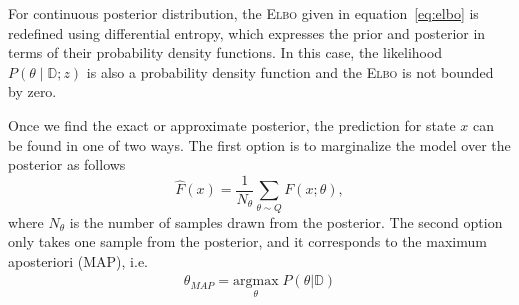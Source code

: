 \begin{rem}
  For continuous posterior distribution, the \textsc{Elbo} given in
  equation~\eqref{eq:elbo} is redefined using differential entropy, which
  expresses the prior and posterior in terms of their probability density
  functions. In this case, the likelihood $P(\theta \mid \mathbb{D};z)$ is also
  a probability density function and the \textsc{Elbo} is not bounded by zero.
\end{rem}


Once we find the exact or approximate posterior, the prediction for state $x$
can be found in one of two ways. The first option is to marginalize the model
over the posterior as follows~\cite{jospin2020hands}
\begin{equation}
  \hat{F}(x) = \frac{1}{N_{\theta}} \sum_{\theta \sim Q} F(x; \theta),
  \label{eqn:marginalization}
\end{equation} 
where $N_{\theta}$ is the number of samples drawn from the posterior. 
%
%
%
The second option only takes one sample from the posterior, and it corresponds
to the maximum aposteriori (MAP), i.e. 
\begin{align} 
  \theta_{MAP}=\underset{\theta}{\textrm{argmax}}\; P(\theta | \mathbb{D})
\end{align}


